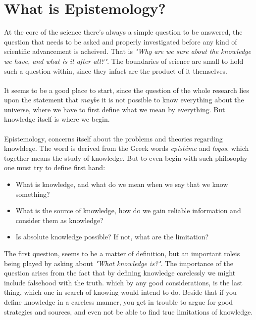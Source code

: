 \documentclass[10pt,a4paper]{article}
\newcounter{theo}
\begin{document}
                \section{What is Epistemology?}
                \indent At the core of the science there's always a simple question to be answered, the question that needs to be asked and properly investigated before any kind of scientific advancement is acheived. That is \textit{"Why are we sure about the knowledge we have, and what is it after all?"}. The boundaries of science are small to hold such a question within, since they infact are the product of it themselves.
                \\
                \\
                It seems to be a good place to start, since the question of the whole research lies upon the statement that \textit{maybe} it is not possible to know everything about the universe, where we have to first define what we mean by everything. But knowledge itself is where we begin.
                \\
                \\
                \indent Epistemology, concerns itself about the problems and theories regarding knowldege. The word is derived from the Greek words \textit{epistéme} and \textit{logos}, which together means the study of knowledge. But to even begin with such philosophy one must try to define first hand:
                \begin{itemize}
                    \item What is knowledge, and what do we mean when we say that we know something?
                    \item What is the source of knowledge, how do we gain reliable information and consider them as knowledge?
                    \item Is absolute knowledge possible? If not, what are the limitation?\cite{CW/E}
                \end{itemize}
                \indent The first question, seems to be a matter of definition, but an important roleis being played by asking about \textit{"What knowledge is?"}. The importance of the question arises from the fact that by defining knowledge carelessly we might include falsehood with the truth. which by any good considerations, is the last thing, which one in search of knowing would intend to do. Beside that if you define knowledge in a careless manner, you get in trouble to argue for good strategies and sources, and even not be able to find true limitations of knowledge.
\end{document}

